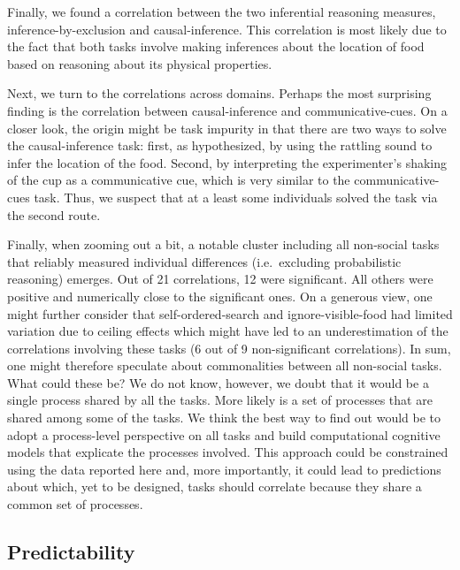 \documentclass[
  man,floatsintext]{apa6}
\begin{document}
Finally, we found a correlation between the two inferential reasoning measures, inference-by-exclusion and causal-inference. This correlation is most likely due to the fact that both tasks involve making inferences about the location of food based on reasoning about its physical properties.

Next, we turn to the correlations across domains. Perhaps the most surprising finding is the correlation between causal-inference and communicative-cues. On a closer look, the origin might be task impurity in that there are two ways to solve the causal-inference task: first, as hypothesized, by using the rattling sound to infer the location of the food. Second, by interpreting the experimenter's shaking of the cup as a communicative cue, which is very similar to the communicative-cues task. Thus, we suspect that at a least some individuals solved the task via the second route.

Finally, when zooming out a bit, a notable cluster including all non-social tasks that reliably measured individual differences (i.e.~excluding probabilistic reasoning) emerges. Out of 21 correlations, 12 were significant. All others were positive and numerically close to the significant ones. On a generous view, one might further consider that self-ordered-search and ignore-visible-food had limited variation due to ceiling effects which might have led to an underestimation of the correlations involving these tasks (6 out of 9 non-significant correlations). In sum, one might therefore speculate about commonalities between all non-social tasks. What could these be? We do not know, however, we doubt that it would be a single process shared by all the tasks. More likely is a set of processes that are shared among some of the tasks. We think the best way to find out would be to adopt a process-level perspective on all tasks and build computational cognitive models that explicate the processes involved. This approach could be constrained using the data reported here and, more importantly, it could lead to predictions about which, yet to be designed, tasks should correlate because they share a common set of processes.

\subsection{Predictability}\label{predictability}
\end{document}
